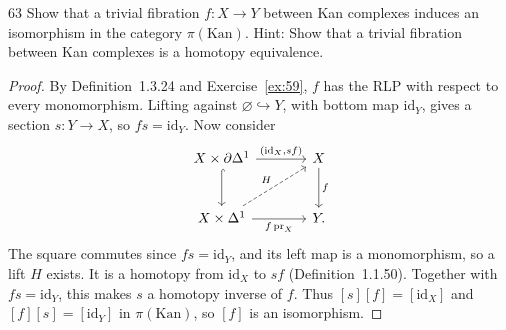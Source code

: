 \begin{exercise}{63}
Show that a trivial fibration $f\colon X\to Y$ between Kan complexes induces
an isomorphism in the category $\pi(\mathrm{Kan})$. Hint: Show that a trivial fibration between Kan
complexes is a homotopy equivalence.

\begin{proof}
By Definition~1.3.24 and Exercise~\ref{ex:59}, $f$ has the
RLP with respect to every monomorphism.
Lifting against $\varnothing\hookrightarrow Y$, with bottom
map $\mathrm{id}_Y$, gives a section $s\colon Y\to X$,
so $fs=\mathrm{id}_Y$.
Now consider
\[
 \begin{tikzcd}[column sep=large,row sep=large]
  X\times\partial\Delta^1
    \arrow[r,"{(\mathrm{id}_X,sf)}"] \arrow[d,hook]
    & X\arrow[d,"f"] \\
  X\times\Delta^1\arrow[r,"f\operatorname{pr}_X"']
    \arrow[ur,dashed,"H"] & Y .
 \end{tikzcd}
\]
The square commutes since $fs=\mathrm{id}_Y$, and its left
map is a monomorphism, so a lift $H$ exists.
It is a homotopy from $\mathrm{id}_X$ to $sf$
(Definition~1.1.50).
Together with $fs=\mathrm{id}_Y$, this makes $s$ a homotopy
inverse of $f$.
Thus $[s][f]=[\mathrm{id}_X]$ and
$[f][s]=[\mathrm{id}_Y]$ in $\pi(\mathrm{Kan})$,
so $[f]$ is an isomorphism.
\end{proof}
\end{exercise}
